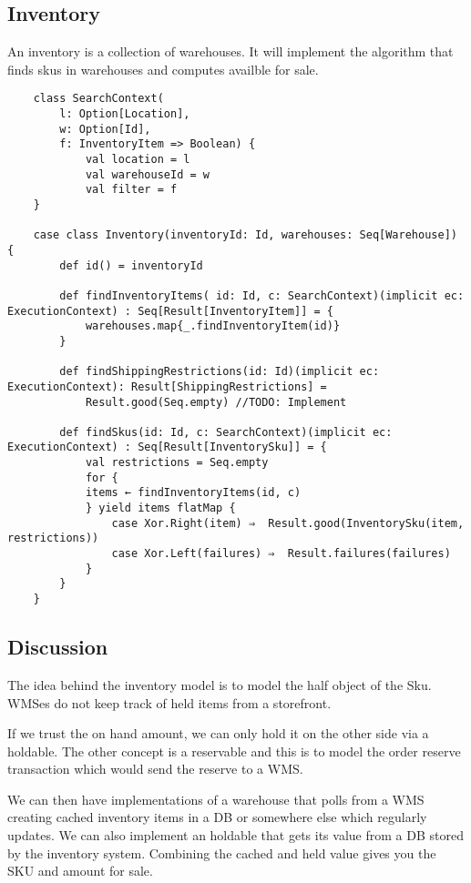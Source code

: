 \documentclass[11pt]{article}
\begin{document}
\subsection{Inventory}

An inventory is a collection of warehouses. It will implement the algorithm that finds
skus in warehouses and computes availble for sale.

\begin{lstlisting}
    class SearchContext(
        l: Option[Location],
        w: Option[Id],
        f: InventoryItem => Boolean) {
            val location = l
            val warehouseId = w
            val filter = f
    }

    case class Inventory(inventoryId: Id, warehouses: Seq[Warehouse]) {
        def id() = inventoryId

        def findInventoryItems( id: Id, c: SearchContext)(implicit ec: ExecutionContext) : Seq[Result[InventoryItem]] = {
            warehouses.map{_.findInventoryItem(id)}
        }

        def findShippingRestrictions(id: Id)(implicit ec: ExecutionContext): Result[ShippingRestrictions] = 
            Result.good(Seq.empty) //TODO: Implement

        def findSkus(id: Id, c: SearchContext)(implicit ec: ExecutionContext) : Seq[Result[InventorySku]] = {
            val restrictions = Seq.empty
            for {
            items ← findInventoryItems(id, c)
            } yield items flatMap {
                case Xor.Right(item) ⇒  Result.good(InventorySku(item, restrictions))
                case Xor.Left(failures) ⇒  Result.failures(failures)
            }
        }
    }
\end{lstlisting}

\subsection{Discussion}

The idea behind the inventory model is to model the half object of the Sku. WMSes do not
keep track of held items from a storefront.

If we trust the on hand amount, we can only hold it on the other side via
a holdable. The other concept is a reservable and this is to model the order reserve transaction
which would send the reserve to a WMS.

We can then have implementations of a warehouse that polls from a WMS creating cached inventory items
in a DB or somewhere else which regularly updates. We can also implement an holdable that
gets its value from a DB stored by the inventory system. Combining the cached and held value
gives you the SKU and amount for sale.
\end{document}

